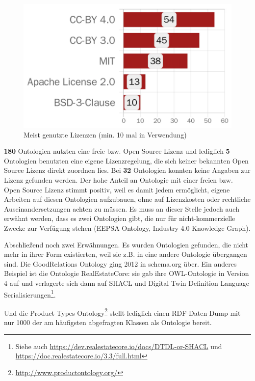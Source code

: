 \documentclass{article}
\begin{document}
\begin{figure}[H]
    \includegraphics[scale=0.26]{bars-license-usage}
    \centering
    \caption{Meist genutzte Lizenzen (min. 10 mal in Verwendung)}
\end{figure}

\textbf{180} Ontologien nutzten eine freie bzw. Open Source Lizenz und lediglich \textbf{5} Ontologien benutzten eine eigene Lizenzregelung, die sich keiner bekannten Open Source Lizenz direkt zuordnen lies.
Bei \textbf{32} Ontologien konnten keine Angaben zur Lizenz gefunden werden.
Der hohe Anteil an Ontologie mit einer freien bzw. Open Source Lizenz stimmt positiv, weil es damit jedem ermöglicht, eigene Arbeiten auf diesen Ontologien aufzubauen, ohne auf Lizenzkosten oder rechtliche Auseinandersetzungen achten zu müssen.
Es muss an dieser Stelle jedoch auch erwähnt werden, dass es zwei Ontologien gibt, die nur für nicht-kommerzielle Zwecke zur Verfügung stehen (EEPSA Ontology, Industry 4.0 Knowledge Graph).

Abschließend noch zwei Erwähnungen.
Es wurden Ontologien gefunden, die nicht mehr in ihrer Form existierten, weil sie z.B. in eine andere Ontologie übergangen sind. Die GoodRelations Ontology ging 2012 in schema.org über. Ein anderes Beispiel ist die Ontologie RealEstateCore: sie gab ihre OWL-Ontologie in Version 4 auf und verlagerte sich dann auf SHACL und Digital Twin Definition Language Serialisierungen\footnote{Siehe auch \url{https://dev.realestatecore.io/docs/DTDL-or-SHACL} und \url{https://doc.realestatecore.io/3.3/full.html}}.

Und die Product Types Ontology\footnote{\url{http://www.productontology.org/}} stellt lediglich einen RDF-Daten-Dump mit nur 1000 der am häufigsten abgefragten Klassen als Ontologie bereit.
\end{document}
